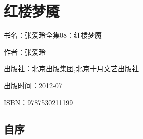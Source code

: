 



\section{红楼梦魇}




\par 书名：张爱玲全集08：红楼梦魇
\par 作者：张爱玲
\par 出版社：北京出版集团,北京十月文艺出版社
\par 出版时间：2012-07
\par ISBN：9787530211199




\subsection{自序}



